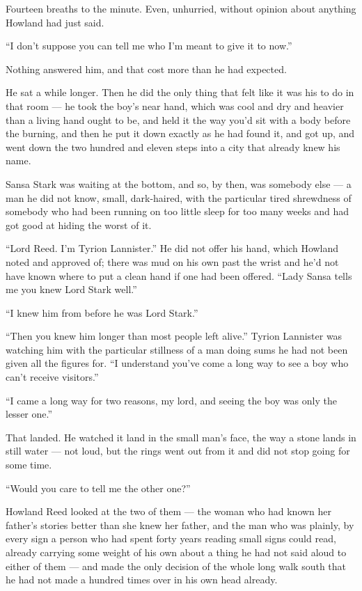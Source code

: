 Fourteen breaths to the minute. Even, unhurried, without opinion about anything Howland had just said.

“I don’t suppose you can tell me who I’m meant to give it to now.”

Nothing answered him, and that cost more than he had expected.

He sat a while longer. Then he did the only thing that felt like it was his to do in that room — he took the boy’s near hand, which was cool and dry and heavier than a living hand ought to be, and held it the way you’d sit with a body before the burning, and then he put it down exactly as he had found it, and got up, and went down the two hundred and eleven steps into a city that already knew his name.

\sceneBreak

Sansa Stark was waiting at the bottom, and so, by then, was somebody else — a man he did not know, small, dark-haired, with the particular tired shrewdness of somebody who had been running on too little sleep for too many weeks and had got good at hiding the worst of it.

“Lord Reed. I’m Tyrion Lannister.” He did not offer his hand, which Howland noted and approved of; there was mud on his own past the wrist and he’d not have known where to put a clean hand if one had been offered. “Lady Sansa tells me you knew Lord Stark well.”

“I knew him from before he was Lord Stark.”

“Then you knew him longer than most people left alive.” Tyrion Lannister was watching him with the particular stillness of a man doing sums he had not been given all the figures for. “I understand you’ve come a long way to see a boy who can’t receive visitors.”

“I came a long way for two reasons, my lord, and seeing the boy was only the lesser one.”

That landed. He watched it land in the small man’s face, the way a stone lands in still water — not loud, but the rings went out from it and did not stop going for some time.

“Would you care to tell me the other one?”

Howland Reed looked at the two of them — the woman who had known her father’s stories better than she knew her father, and the man who was plainly, by every sign a person who had spent forty years reading small signs could read, already carrying some weight of his own about a thing he had not said aloud to either of them — and made the only decision of the whole long walk south that he had not made a hundred times over in his own head already.

